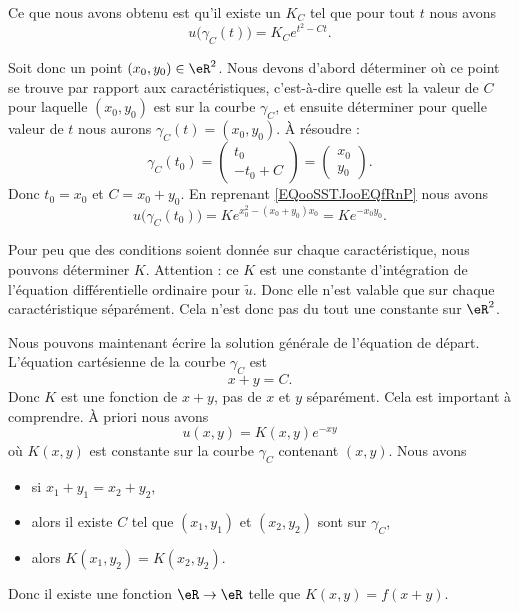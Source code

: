 Ce que nous avons obtenu est qu'il existe un \( K_C\) tel que pour tout \( t\) nous avons
\begin{equation}
	u\big( \gamma_C(t) \big)=K_C e^{t^2-Ct}.
\end{equation}

Soit donc un point \( (x_0,y_0)\in \eR^2\). Nous devons d'abord déterminer où ce point se trouve par rapport aux caractéristiques, c'est-à-dire quelle est la valeur de \( C\) pour laquelle \( (x_0,y_0)\) est sur la courbe \( \gamma_C\), et ensuite déterminer pour quelle valeur de \( t\) nous aurons \( \gamma_C(t)=(x_0,y_0)\). À résoudre :
\begin{equation}
	\gamma_C(t_0)=\begin{pmatrix}
		t_0 \\
		-t_0+C
	\end{pmatrix}=\begin{pmatrix}
		x_0 \\
		y_0
	\end{pmatrix}.
\end{equation}
Donc \( t_0=x_0\) et \( C=x_0+y_0\). En reprenant \eqref{EQooSSTJooEQfRnP} nous avons
\begin{equation}
	u\big( \gamma_C(t_0) \big)=K e^{x_0^2-(x_0+y_0)x_0}=K e^{-x_0y_0}.
\end{equation}

Pour peu que des conditions soient donnée sur chaque caractéristique, nous pouvons déterminer \( K\). Attention : ce \( K\) est une constante d'intégration de l'équation différentielle ordinaire pour \( \tilde u\). Donc elle n'est valable que sur chaque caractéristique séparément. Cela n'est donc pas du tout une constante sur \( \eR^2\).

Nous pouvons maintenant écrire la solution générale de l'équation de départ. L'équation cartésienne de la courbe \( \gamma_C\) est
\begin{equation}
	x+y=C.
\end{equation}
Donc \( K\) est une fonction de \( x+y\), pas de \( x\) et \( y\) séparément. Cela est important à comprendre. À priori nous avons
\begin{equation}
	u(x,y)=K(x,y) e^{-xy}
\end{equation}
où \( K(x,y)\) est constante sur la courbe \( \gamma_C\) contenant \( (x,y)\). Nous avons
\begin{itemize}
	\item si \( x_1+y_1=x_2+y_2\),
	\item alors il existe \( C\) tel que \( (x_1,y_1)\) et \( (x_2,y_2)\) sont sur \( \gamma_C\),
	\item alors \( K(x_1,y_2)=K(x_2,y_2)\).
\end{itemize}
Donc il existe une fonction \( \eR\to \eR\) telle que \( K(x,y)=f(x+y)\).

